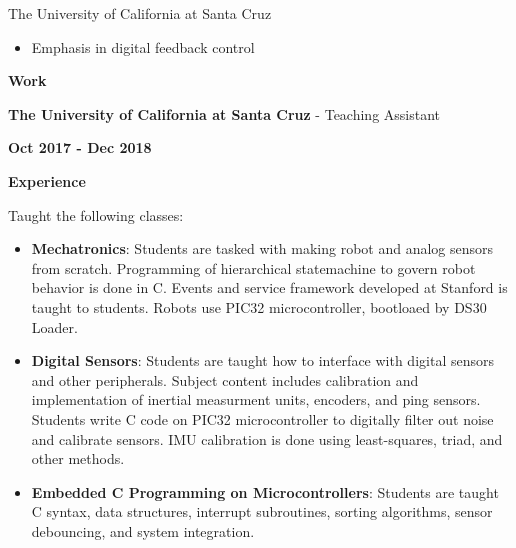 \documentclass[paper=a4,fontsize=11pt]{article} %
\def \sectionSpace      {0.7cm}     %
\def \leftColSpace      {0.12}      %
\def \middleColSpace    {0.675}     %
\def \bigMiddleColSpace {0.875}     %
\def \rightColSpace     {0.25}      %
\begin{document}
\noindent
\begin{minipage}[t]{\leftColSpace\linewidth}
    \hfill
\end{minipage}
\begin{minipage}[t]{\bigMiddleColSpace\linewidth}
    \noindent The University of California at Santa Cruz
    \begin{itemize}[noitemsep,topsep=0pt]
        \item Emphasis in digital feedback control
    \end{itemize}
\end{minipage}

\vspace{\sectionSpace}
\noindent
\begin{minipage}[t]{\leftColSpace\linewidth}
    \noindent \textbf{Work}
\end{minipage}
\begin{minipage}[t]{\middleColSpace\linewidth}
    \noindent \textbf{The University of California at Santa Cruz} - Teaching Assistant
\end{minipage}
\begin{minipage}[t]{\rightColSpace\linewidth}
    \noindent \textbf{Oct 2017 - Dec 2018}
\end{minipage}

\noindent
\begin{minipage}[t]{\leftColSpace\linewidth}
    \noindent \textbf{Experience}
\end{minipage}
\begin{minipage}[t]{\bigMiddleColSpace\linewidth}
    \begin{flushleft}
    \noindent Taught the following classes:
    \begin{itemize}[noitemsep,topsep=0pt]
        \item \textbf{Mechatronics}: Students are tasked with making robot and analog sensors from scratch. Programming of hierarchical statemachine to govern robot behavior is done in C. Events and service framework developed at Stanford is taught to students. Robots use PIC32 microcontroller, bootloaed by DS30 Loader.
        \item \textbf{Digital Sensors}: Students are taught how to interface with digital sensors and other peripherals. Subject content includes calibration and implementation of inertial measurment units, encoders, and ping sensors. Students write C code on PIC32 microcontroller to digitally filter out noise and calibrate sensors. IMU calibration is done using least-squares, triad, and other methods. 
        \item \textbf{Embedded C Programming on Microcontrollers}: Students are taught C syntax, data structures, interrupt subroutines, sorting algorithms, sensor debouncing, and system integration. 
    \end{itemize}
    \end{flushleft}
\end{minipage}
\end{document}
